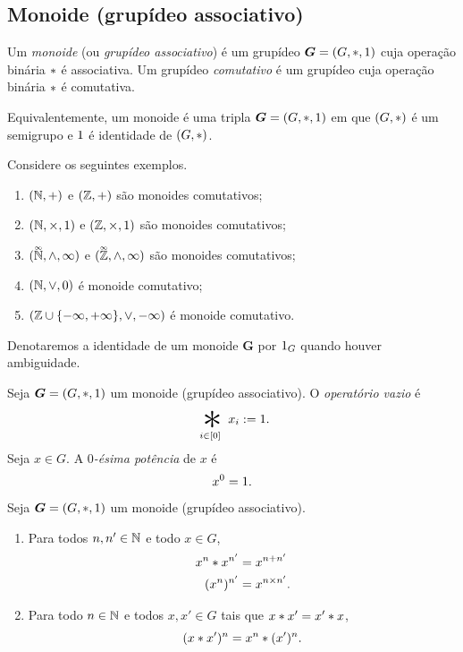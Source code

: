 \subsection{Monoide (grupídeo associativo)}

\begin{definition}
Um \emph{monoide} (ou \emph{grupídeo associativo}) é um grupídeo $\bm G=(G,\ast,1)$ cuja operação binária $\ast$ é associativa. Um grupídeo \emph{comutativo} é um grupídeo cuja operação binária $\ast$ é comutativa.
\end{definition}

Equivalentemente, um monoide é uma tripla $\bm G=(G,\ast,1)$ em que $(G,\ast)$ é um semigrupo e $1$ é identidade de $(G,\ast)$.

\begin{example}
Considere os seguintes exemplos.
	\begin{enumerate}
	\item $(\mathbb{N},+)$ e $(\mathbb{Z},+)$ são monoides comutativos;
	\item $(\mathbb{N},\times,1)$ e $(\mathbb{Z},\times,1)$ são monoides comutativos;
	\item $(\accentset{\infty}{\mathbb{N}},\mathbin{\wedge},\infty)$ e $(\accentset{\infty}{\mathbb{Z}},\mathbin{\wedge},\infty)$ são monoides comutativos;
	\item $(\mathbb{N},\mathbin{\vee},0)$ é monoide comutativo;
	\item $(\mathbb{Z} \cup \{-\infty,+\infty\},\mathbin{\vee},-\infty)$ é monoide comutativo.
	\end{enumerate}
\end{example}

\begin{notation}
Denotaremos a identidade de um monoide $\bm G$ por $1_G$ quando houver ambiguidade.
\end{notation}

\begin{definition}
Seja $\bm G=(G,\ast,1)$ um monoide (grupídeo associativo). O \emph{operatório vazio} é
	\begin{equation*}
	\bigopb_{i \in [0]} x_i := \id.
	\end{equation*}
Seja $x \in G$. A \emph{$0$-ésima potência} de $x$ é
	\begin{equation*}
	x^0 = 1.
	\end{equation*}
\end{definition}

\begin{exercise}
Seja $\bm G=(G,\ast,1)$ um monoide (grupídeo associativo).
	\begin{enumerate}
	\item Para todos $n,n' \in \mathbb{N}$ e todo $x \in G$,
		\begin{align*}
		x^{n} \ast x^{n'} &= x^{n+n'} \\
		(x^n)^{n'} &= x^{n \times n'}.
		\end{align*}
	\item Para todo $n \in \mathbb{N}$ e todos $x,x' \in G$ tais que $x \ast x' = x' \ast x$,
		\begin{equation*}
		(x \ast x')^n = x^n \ast (x')^n.
		\end{equation*}
	\end{enumerate}
\end{exercise}

